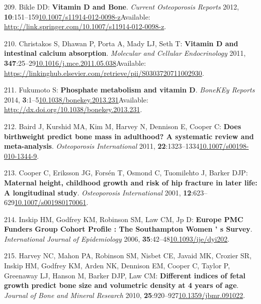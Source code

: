 \documentclass[
]{book}
\begin{document}
\leavevmode\hypertarget{ref-Bikle2012}{}%
209. Bikle DD: \textbf{Vitamin D and Bone}. \emph{Current Osteoporosis Reports} 2012, \textbf{10}:151--159\href{https://doi.org/10.1007/s11914-012-0098-z}{10.1007/s11914-012-0098-z}Available: \url{http://link.springer.com/10.1007/s11914-012-0098-z}.

\leavevmode\hypertarget{ref-Christakos2011}{}%
210. Christakos S, Dhawan P, Porta A, Mady LJ, Seth T: \textbf{Vitamin D and intestinal calcium absorption}. \emph{Molecular and Cellular Endocrinology} 2011, \textbf{347}:25--29\href{https://doi.org/10.1016/j.mce.2011.05.038}{10.1016/j.mce.2011.05.038}Available: \url{https://linkinghub.elsevier.com/retrieve/pii/S0303720711002930}.

\leavevmode\hypertarget{ref-Fukumoto2014}{}%
211. Fukumoto S: \textbf{Phosphate metabolism and vitamin D}. \emph{BoneKEy Reports} 2014, \textbf{3}:1--5\href{https://doi.org/10.1038/bonekey.2013.231}{10.1038/bonekey.2013.231}Available: \url{http://dx.doi.org/10.1038/bonekey.2013.231}.

\leavevmode\hypertarget{ref-Baird2011}{}%
212. Baird J, Kurshid MA, Kim M, Harvey N, Dennison E, Cooper C: \textbf{Does birthweight predict bone mass in adulthood? A systematic review and meta-analysis}. \emph{Osteoporosis International} 2011, \textbf{22}:1323--1334\href{https://doi.org/10.1007/s00198-010-1344-9}{10.1007/s00198-010-1344-9}.

\leavevmode\hypertarget{ref-Cooper2001}{}%
213. Cooper C, Eriksson JG, Forsén T, Osmond C, Tuomilehto J, Barker DJP: \textbf{Maternal height, childhood growth and risk of hip fracture in later life: A longitudinal study}. \emph{Osteoporosis International} 2001, \textbf{12}:623--629\href{https://doi.org/10.1007/s001980170061}{10.1007/s001980170061}.

\leavevmode\hypertarget{ref-Inskip2006}{}%
214. Inskip HM, Godfrey KM, Robinson SM, Law CM, Jp D: \textbf{Europe PMC Funders Group Cohort Profile : The Southampton Women ' s Survey}. \emph{International Journal of Epidemiology} 2006, \textbf{35}:42--48\href{https://doi.org/10.1093/ije/dyi202}{10.1093/ije/dyi202}.

\leavevmode\hypertarget{ref-Harvey2010a}{}%
215. Harvey NC, Mahon PA, Robinson SM, Nisbet CE, Javaid MK, Crozier SR, Inskip HM, Godfrey KM, Arden NK, Dennison EM, Cooper C, Taylor P, Greenaway LJ, Hanson M, Barker DJP, Law CM: \textbf{Different indices of fetal growth predict bone size and volumetric density at 4 years of age}. \emph{Journal of Bone and Mineral Research} 2010, \textbf{25}:920--927\href{https://doi.org/10.1359/jbmr.091022}{10.1359/jbmr.091022}.
\end{document}
